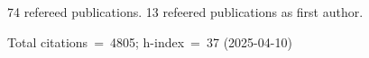 74 refereed publications. 13 refeered publications as first author.

Total citations~=~4805; h-index~=~37 (2025-04-10)